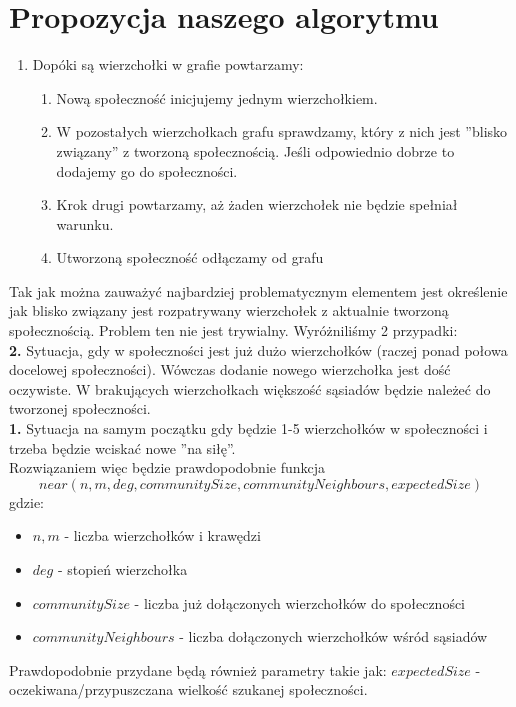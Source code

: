 \documentclass{article}
\begin{document}
\section{Propozycja naszego algorytmu}
\begin{enumerate}
    \item Dopóki są wierzchołki w grafie powtarzamy:
    \begin{enumerate}
        \item Nową społeczność inicjujemy jednym wierzchołkiem.
        \item W pozostałych wierzchołkach grafu sprawdzamy, który z nich jest ''blisko związany'' z tworzoną społecznością. Jeśli odpowiednio dobrze to dodajemy go do społeczności.
        \item Krok drugi powtarzamy, aż żaden wierzchołek nie będzie spełniał warunku.
        \item Utworzoną społeczność odłączamy od grafu
    \end{enumerate}
\end{enumerate}

Tak jak można zauważyć najbardziej problematycznym elementem jest określenie jak blisko związany jest rozpatrywany wierzchołek z aktualnie tworzoną społecznością. Problem ten nie jest trywialny. Wyróżniliśmy 2 przypadki:\\
\textbf{2.} Sytuacja, gdy w społeczności jest już dużo wierzchołków (raczej ponad połowa docelowej społeczności). Wówczas dodanie nowego wierzchołka jest dość oczywiste. W brakujących wierzchołkach większość sąsiadów będzie należeć do tworzonej społeczności. \\
\textbf{1.} Sytuacja na samym początku gdy będzie 1-5 wierzchołków w społeczności i trzeba będzie wciskać nowe ''na siłę''. \\

Rozwiązaniem więc będzie prawdopodobnie funkcja $$near(n, m, deg, communitySize, communityNeighbours, expectedSize)$$ gdzie:
\begin{itemize}
    \item $n, m$ - liczba wierzchołków i krawędzi
    \item $deg$ - stopień wierzchołka
    \item $communitySize$ - liczba już dołączonych wierzchołków do społeczności
    \item $communityNeighbours$ - liczba dołączonych wierzchołków wśród sąsiadów
\end{itemize}
Prawdopodobnie przydane będą również parametry takie jak: $expectedSize$ - oczekiwana/przypuszczana wielkość szukanej społeczności. \\
\end{document}
